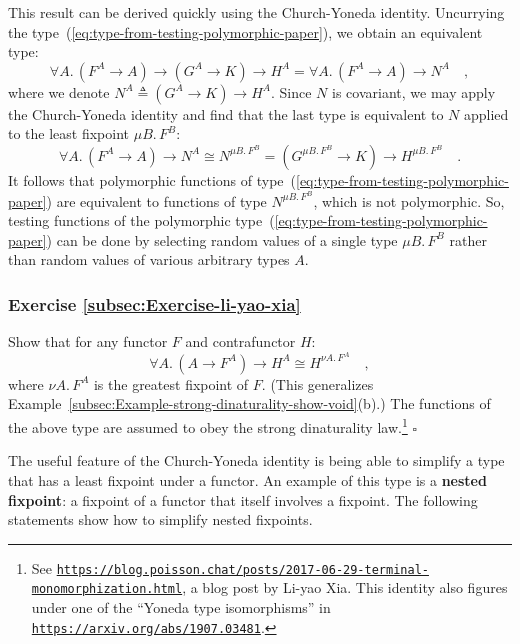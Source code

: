 This result can be derived quickly using the Church-Yoneda identity.
Uncurrying the type~(\ref{eq:type-from-testing-polymorphic-paper}),
we obtain an equivalent type:
\[
\forall A.\,(F^{A}\rightarrow A)\rightarrow(G^{A}\rightarrow K)\rightarrow H^{A}=\forall A.\,(F^{A}\rightarrow A)\rightarrow N^{A}\quad,
\]
where we denote $N^{A}\triangleq(G^{A}\rightarrow K)\rightarrow H^{A}$.
Since $N$ is covariant, we may apply the Church-Yoneda identity and
find that the last type is equivalent to $N$ applied to the least
fixpoint $\mu B.\,F^{B}$:
\[
\forall A.\,(F^{A}\rightarrow A)\rightarrow N^{A}\cong N^{\mu B.\,F^{B}}=(G^{\mu B.\,F^{B}}\rightarrow K)\rightarrow H^{\mu B.\,F^{B}}\quad.
\]
It follows that polymorphic functions of type~(\ref{eq:type-from-testing-polymorphic-paper})
are equivalent to functions of type $N^{\mu B.\,F^{B}}$, which is
not polymorphic. So, testing functions of the polymorphic type~(\ref{eq:type-from-testing-polymorphic-paper})
can be done by selecting random values of a single type $\mu B.\,F^{B}$
rather than random values of various arbitrary types $A$.

\subsubsection{Exercise \label{subsec:Exercise-li-yao-xia}\ref{subsec:Exercise-li-yao-xia}}

Show that for any functor $F$ and contrafunctor $H$:
\[
\forall A.\,(A\rightarrow F^{A})\rightarrow H^{A}\cong H^{\nu A.\,F^{A}}\quad,
\]
where $\nu A.\,F^{A}$ is the greatest fixpoint of $F$. (This generalizes
Example~\ref{subsec:Example-strong-dinaturality-show-void}(b).)
The functions of the above type are assumed to obey the strong dinaturality
law.\footnote{See \texttt{\href{https://blog.poisson.chat/posts/2017-06-29-terminal-monomorphization.html}{https://blog.poisson.chat/posts/2017-06-29-terminal-monomorphization.html}},
a blog post by Li-yao Xia. This identity also figures
under one of the \textsf{``}Yoneda type isomorphisms\textsf{''} in \texttt{\href{https://arxiv.org/abs/1907.03481}{https://arxiv.org/abs/1907.03481}}.} $\square$

The useful feature of the Church-Yoneda identity is being able to
simplify a type that has a least fixpoint under a functor. An example
of this type is a \textbf{nested fixpoint}:
a fixpoint of a functor that itself involves a fixpoint. The following
statements show how to simplify nested fixpoints.


